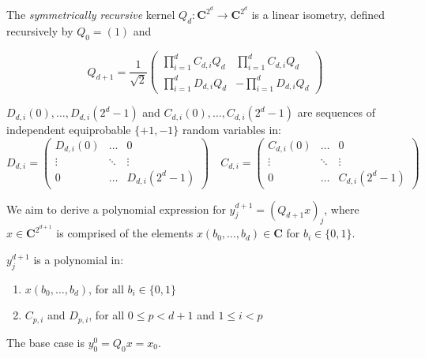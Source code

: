 \documentclass[10pt]{article}
\begin{document}
The \textit{symmetrically recursive} kernel $Q_d:\mathbf{C}^{2^d}\to\mathbf{C}^{2^d}$ is a linear isometry, defined recursively by $Q_0=\left(1\right)$ and

\[
Q_{d+1}=\frac{1}{\sqrt{2}}
\left(
\begin{matrix}
\prod_{i=1}^d C_{d,i} Q_d & \prod_{i=1}^d C_{d,i} Q_d \\
\prod_{i=1}^d D_{d,i} Q_d & -\prod_{i=1}^d D_{d,i} Q_d
\end{matrix}\right)
\]

$D_{d,i}(0),\dots,D_{d,i}(2^d-1)$ and $C_{d,i}(0),\dots,C_{d,i}(2^d-1)$ are sequences of independent equiprobable $\{+1,-1\}$ random variables in:
\[
D_{d,i} = \left(
\begin{matrix}
D_{d,i}(0) & \dots & 0 \\
\vdots & \ddots & \vdots \\
0 & \dots & D_{d,i}(2^d-1)
\end{matrix}\right)
\quad
C_{d,i} = \left(
\begin{matrix}
C_{d,i}(0) & \dots & 0 \\
\vdots & \ddots & \vdots \\
0 & \dots & C_{d,i}(2^d-1)
\end{matrix}\right)
\]

We aim to derive a polynomial expression for $y^{d+1}_j=(Q_{d+1}x)_j$, where $x\in\mathbf{C}^{2^{d+1}}$ is comprised of the elements $x(b_0,\dots, b_{d})\in\mathbf{C}$ for $b_i\in\{0,1\}$.

$y^{d+1}_j$ is a polynomial in:
\begin{enumerate}
	\item $x(b_0,\dots, b_{d})$, for all $b_i\in\{0,1\}$
	\item $C_{p,i}$ and $D_{p,i}$, for all $0\le p<d+1$ and $1\le i < p$
\end{enumerate}

The base case is $y_0^0=Q_0x=x_0$.
\end{document}

